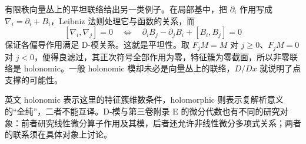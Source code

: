 \ProseParagraphBreak
有限秩向量丛上的平坦联络给出另一类例子。在局部基中，把 \(\partial_i\) 作用写成 \(\nabla_i=\partial_i+B_i\)，Leibniz 法则处理它与函数的关系，而
\[
	[\nabla_i,\nabla_j]=0 \quad\Longleftrightarrow\quad \partial_iB_j-\partial_jB_i+[B_i,B_j]=0
\]
保证各偏导作用满足 D-模关系。这就是平坦性。取 \(F_jM=M\) 对 \(j\ge0\)、\(F_jM=0\) 对 \(j<0\)，便得良滤过，其正次符号全部作用为零，特征簇为零截面，所以非零联络是 holonomic。一般 holonomic 模却未必是向量丛上的联络，\(D/Dx\) 就说明了点支撑的可能性。

\ProseParagraphBreak
英文 holonomic 表示这里的特征簇维数条件，holomorphic 则表示复解析意义的“全纯”，二者不能互译。D-模与第三卷附录 E 的微分代数也有不同的研究对象：前者研究线性微分算子作用及其模，后者还允许非线性微分多项式关系；两者的联系须在具体对象上讨论。
